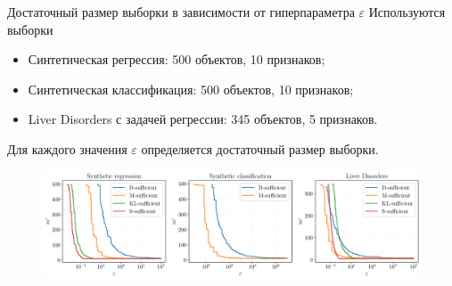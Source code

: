 \documentclass[aspectratio=169]{beamer}
\begin{document}
\begin{frame}{Достаточный размер выборки в зависимости от гиперпараметра $\varepsilon$}
    Используются выборки
    \begin{itemize}
        \item Синтетическая регрессия: 500 объектов, 10 признаков;
        \item Синтетическая классификация: 500 объектов, 10 признаков;
        \item Liver Disorders с задачей регрессии: 345 объектов, 5 признаков. 
    \end{itemize}
    Для каждого значения $\varepsilon$ определяется достаточный размер выборки.
    \begin{figure}
        \includegraphics[width=\textwidth]{sufficient-vs-threshold}
    \end{figure}
\end{frame}
\end{document}
